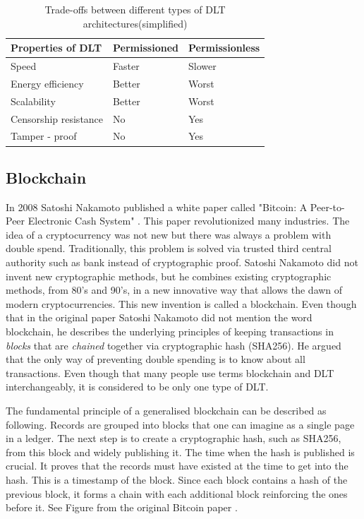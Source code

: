 \begin{table}[ht]
\centering
\caption{Trade-offs between different types of DLT architectures(simplified)}
\label{properties-of-DLT}
\begin{tabular}{|l|l|l|}
\cline{1-3}
\textbf{Properties of DLT} & \textbf{Permissioned} & \textbf{Permissionless} \\ \hline
Speed & Faster & Slower \\ \hline
Energy efficiency & Better & Worst \\ \hline
Scalability & Better & Worst \\ \hline
Censorship resistance & No & Yes \\ \hline
Tamper - proof & No & Yes \\ \hline
\end{tabular}
\end{table}

\subsection{Blockchain}
In 2008 Satoshi Nakamoto published a white paper called "Bitcoin: A Peer-to-Peer Electronic Cash System" \cite{nakamoto_bitcoin:_2008}. This paper revolutionized many industries. The idea of a cryptocurrency was not new but there was always a problem with double spend. Traditionally, this problem is solved via trusted third central authority such as bank instead of cryptographic proof. Satoshi Nakamoto did not invent new cryptographic methods, but he combines existing cryptographic methods, from 80's and 90's, in a new innovative way that allows the dawn of modern cryptocurrencies. This new invention is called a blockchain. Even though that in the original paper Satoshi Nakamoto did not mention the word blockchain, he describes the underlying principles of keeping transactions in \textit{blocks} that are \textit{chained} together via cryptographic hash (SHA256). He argued that the only way of preventing double spending is to know about all transactions. Even though that many people use terms blockchain and DLT interchangeably, it is considered to be only one type of DLT.

The fundamental principle of a generalised blockchain can be described as following. Records are grouped into blocks that one can imagine as a single page in a ledger. The next step is to create a cryptographic hash, such as SHA256, from this block and widely publishing it. The time when the hash is published is crucial. It proves that the records must have existed at the time to get into the hash. This is a timestamp of the block. Since each block contains a hash of the previous block, it forms a chain with each additional block reinforcing the ones before it. See Figure from the original Bitcoin paper \cite{nakamoto_bitcoin:_2008}.

